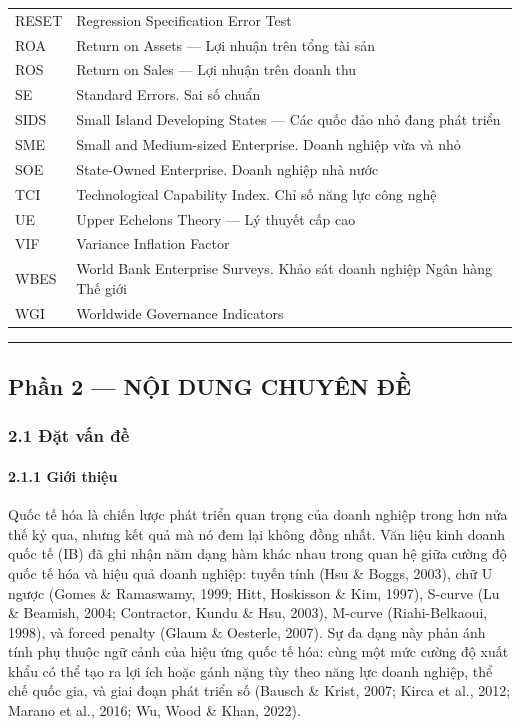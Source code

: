 \documentclass[12pt,a4paper]{article}
\begin{document}
\begin{longtable}[]{@{}ll@{}}
RESET & Regression Specification Error Test \\
ROA & Return on Assets --- Lợi nhuận trên tổng tài sản \\
ROS & Return on Sales --- Lợi nhuận trên doanh thu \\
SE & Standard Errors. Sai số chuẩn \\
SIDS & Small Island Developing States --- Các quốc đảo nhỏ đang phát
triển \\
SME & Small and Medium-sized Enterprise. Doanh nghiệp vừa và nhỏ \\
SOE & State-Owned Enterprise. Doanh nghiệp nhà nước \\
TCI & Technological Capability Index. Chỉ số năng lực công nghệ \\
UE & Upper Echelons Theory --- Lý thuyết cấp cao \\
VIF & Variance Inflation Factor \\
WBES & World Bank Enterprise Surveys. Khảo sát doanh nghiệp Ngân hàng
Thế giới \\
WGI & Worldwide Governance Indicators \\
\end{longtable}

\begin{center}\rule{0.5\linewidth}{0.5pt}\end{center}

\hypertarget{phux1ea7n-2--nux1ed9i-dung-chuyuxean-ux111ux1ec1}{%
\subsection{Phần 2 --- NỘI DUNG CHUYÊN
ĐỀ}\label{phux1ea7n-2--nux1ed9i-dung-chuyuxean-ux111ux1ec1}}

\hypertarget{21-ux111ux1eb7t-vux1ea5n-ux111ux1ec1}{%
\subsubsection{2.1 Đặt vấn
đề}\label{21-ux111ux1eb7t-vux1ea5n-ux111ux1ec1}}

\hypertarget{211-giux1edbi-thiux1ec7u}{%
\paragraph{2.1.1 Giới thiệu}\label{211-giux1edbi-thiux1ec7u}}

Quốc tế hóa là chiến lược phát triển quan trọng của doanh nghiệp trong
hơn nửa thế kỷ qua, nhưng kết quả mà nó đem lại không đồng nhất. Văn
liệu kinh doanh quốc tế (IB) đã ghi nhận năm dạng hàm khác nhau trong
quan hệ giữa cường độ quốc tế hóa và hiệu quả doanh nghiệp: tuyến tính
(Hsu \& Boggs, 2003), chữ U ngược (Gomes \& Ramaswamy, 1999; Hitt,
Hoskisson \& Kim, 1997), S-curve (Lu \& Beamish, 2004; Contractor, Kundu
\& Hsu, 2003), M-curve (Riahi-Belkaoui, 1998), và forced penalty (Glaum
\& Oesterle, 2007). Sự đa dạng này phản ánh tính phụ thuộc ngữ cảnh của
hiệu ứng quốc tế hóa: cùng một mức cường độ xuất khẩu có thể tạo ra lợi
ích hoặc gánh nặng tùy theo năng lực doanh nghiệp, thể chế quốc gia, và
giai đoạn phát triển số (Bausch \& Krist, 2007; Kirca et al., 2012;
Marano et al., 2016; Wu, Wood \& Khan, 2022).
\end{document}
